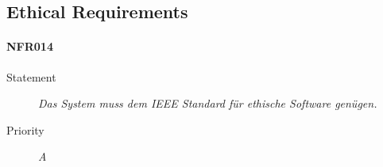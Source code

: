 \subsection{Ethical Requirements}

\paragraph{NFR014}
\begin{description}
\item[Statement] \textit{Das System muss dem \gls{IEEE} Standard für ethische Software genügen.}
\item[Priority] \textit{A}
\end{description}